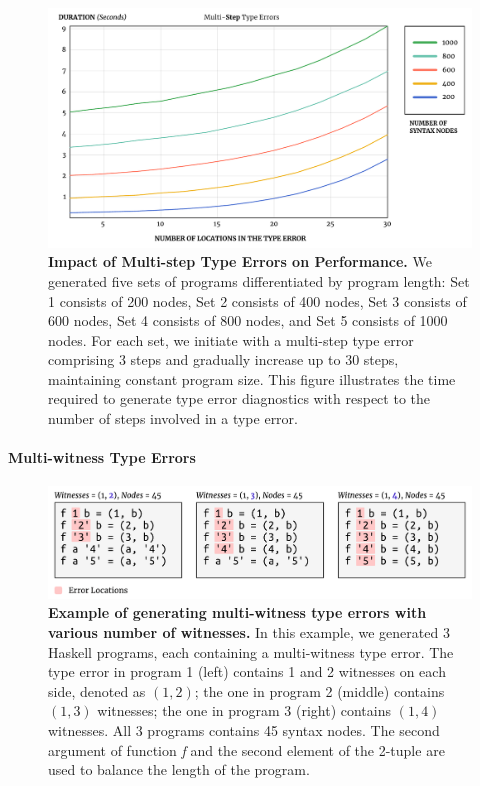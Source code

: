 \documentclass[pdflatex,lineno,sn-nature,Numbered]{sn-jnl}%
\begin{document}
\begin{figure}[ht]
    \centering
    \includegraphics[width=\linewidth]{images/MultiStepDuration}
    \caption{{\bf Impact of Multi-step Type Errors on Performance.} We generated five sets of programs differentiated by program length: Set 1 consists of 200 nodes, Set 2 consists of 400 nodes, Set 3 consists of 600 nodes, Set 4 consists of 800 nodes, and Set 5 consists of 1000 nodes. For each set, we initiate with a multi-step type error comprising 3 steps and gradually increase up to 30 steps, maintaining constant program size. This figure illustrates the time required to generate type error diagnostics with respect to the number of steps involved in a type error. }
    \label{fig:multi-step-time}
\end{figure}

\paragraph{Multi-witness Type Errors}

\begin{figure}[ht]
    \centering
    \includegraphics[width=\linewidth]{images/MultiWitnessMutation}
    \caption{{\bf Example of generating multi-witness type errors with various number of witnesses.} In this example, we generated 3 Haskell programs, each containing a multi-witness type error. The type error in program 1 (left) contains 1 and 2 witnesses on each side, denoted as $(1, 2)$; the one in program 2 (middle) contains $(1, 3)$ witnesses; the one in program 3 (right) contains $(1, 4)$ witnesses. All 3 programs contains 45 syntax nodes. The second argument of function {\it f} and the second element of the 2-tuple are used to balance the length of the program.
    } 
    \label{fig:multi-witness-mutation}
\end{figure}
\end{document}
